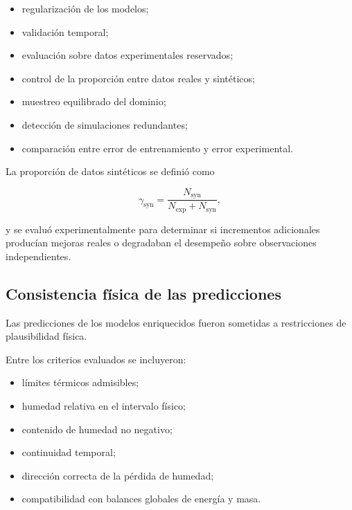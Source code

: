 \begin{itemize}
    \item regularización de los modelos;
    \item validación temporal;
    \item evaluación sobre datos experimentales reservados;
    \item control de la proporción entre datos reales y sintéticos;
    \item muestreo equilibrado del dominio;
    \item detección de simulaciones redundantes;
    \item comparación entre error de entrenamiento y error experimental.
\end{itemize}

La proporción de datos sintéticos se definió como

\begin{equation}
\gamma_{\mathrm{syn}}
=
\frac{N_{\mathrm{syn}}}
{N_{\mathrm{exp}}+N_{\mathrm{syn}}},
\label{eq:proporcion_sintetica}
\end{equation}

y se evaluó experimentalmente para determinar si incrementos adicionales producían mejoras reales o degradaban el desempeño sobre observaciones independientes.

\subsection{Consistencia física de las predicciones}
\label{subsec:consistencia_fisica_predictions}

Las predicciones de los modelos enriquecidos fueron sometidas a restricciones de plausibilidad física.

Entre los criterios evaluados se incluyeron:

\begin{itemize}
    \item límites térmicos admisibles;
    \item humedad relativa en el intervalo físico;
    \item contenido de humedad no negativo;
    \item continuidad temporal;
    \item dirección correcta de la pérdida de humedad;
    \item compatibilidad con balances globales de energía y masa.
\end{itemize}

